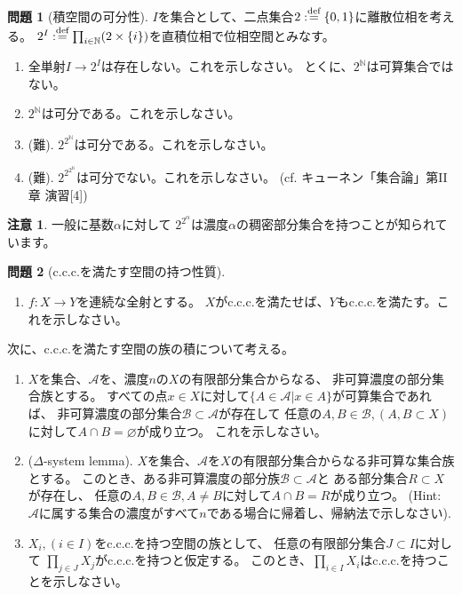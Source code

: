 \documentclass[uplatex]{jsarticle}
\theoremstyle{definition}
\newtheorem{prob}[prob]{問題}
\newtheorem*{rem*}{注意}
\renewcommand{\emptyset}{\varnothing}
\newcommand{\dfn}{:\overset{\mbox{{\scriptsize def}}}{=}}
\newcommand{\N}{\mathbb{N}}
\newcommand{\mcA}{\mathcal{A}}
\newcommand{\mcB}{\mathcal{B}}
\begin{document}
\begin{prob}[積空間の可分性]\label{power separable}
  \(I\)を集合として、二点集合\(2\dfn \{0,1\}\)に離散位相を考える。
  \(2^I\dfn \prod_{i\in \N}(2\times \{i\})\)を直積位相で位相空間とみなす。
  \begin{enumerate}
    \item
    全単射\(I\to 2^I\)は存在しない。これを示しなさい。
    とくに、\(2^{\N}\)は可算集合ではない。
    \item
    \(2^{\N}\)は可分である。これを示しなさい。
    \item (難).
    \(2^{2^{\N}}\)は可分である。これを示しなさい。
    \item (難).
    \(2^{2^{2^{\N}}}\)は可分でない。これを示しなさい。
    (cf. キューネン「集合論」第II章 演習[4])
  \end{enumerate}
\end{prob}



\begin{rem*}
  一般に基数\(\alpha\)に対して
  \(2^{2^{\alpha}}\)は濃度\(\alpha\)の稠密部分集合を持つことが知られています。
\end{rem*}



\begin{prob}[c.c.c.を満たす空間の持つ性質]\label{prod c.c.c.}
  \
  \begin{enumerate}
    \item \(f:X\to Y\)を連続な全射とする。
    \(X\)がc.c.c.を満たせば、\(Y\)もc.c.c.を満たす。これを示しなさい。
  \end{enumerate}
  次に、c.c.c.を満たす空間の族の積について考える。
  \begin{enumerate}[start=3]
    \item
    \(X\)を集合、\(\mcA\)を、濃度\(n\)の\(X\)の有限部分集合からなる、
    非可算濃度の部分集合族とする。
    すべての点\(x\in X\)に対して\(\{A\in \mcA | x\in A\}\)が可算集合であれば、
    非可算濃度の部分集合\(\mcB\subset \mcA\)が存在して
    任意の\(A,B\in \mcB, (A,B\subset X)\)に対して\(A\cap B = \emptyset\)が成り立つ。
    これを示しなさい。
    \item (\(\Delta\)-system lemma).
    \(X\)を集合、\(\mcA\)を\(X\)の有限部分集合からなる非可算な集合族とする。
    このとき、ある非可算濃度の部分族\(\mcB\subset \mcA\)と
    ある部分集合\(R\subset X\)が存在し、
    任意の\(A,B\in \mcB, A\neq B\)に対して\(A\cap B = R\)が成り立つ。
    (Hint: \(\mcA\)に属する集合の濃度がすべて\(n\)である場合に帰着し、帰納法で示しなさい).
    \item
    \(X_i, (i\in I)\)をc.c.c.を持つ空間の族として、
    任意の有限部分集合\(J\subset I\)に対して
    \(\prod_{j\in J}X_j\)がc.c.c.を持つと仮定する。
    このとき、\(\prod_{i\in I}X_i\)はc.c.c.を持つことを示しなさい。
  \end{enumerate}
\end{prob}
\end{document}
